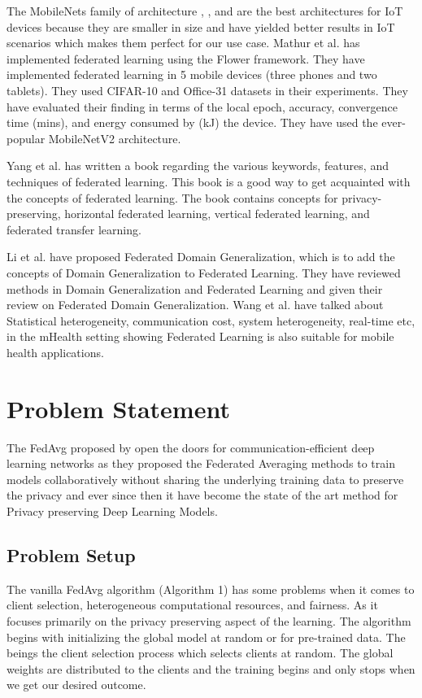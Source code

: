 \documentclass[conference]{IEEEtran}
\begin{document}
The MobileNets family of architecture \cite{howard2017mobilenets}, \cite{sandler2018mobilenetv2}, and \cite{howard2019searching} are the best architectures for IoT devices because they are smaller in size and have yielded better results in IoT scenarios which makes them perfect for our use case. Mathur et al. \cite{mathur2021device} has implemented federated learning using the Flower framework. They have implemented federated learning in 5 mobile devices (three phones and two tablets). They used CIFAR-10 and Office-31 datasets in their experiments. They have evaluated their finding in terms of the local epoch, accuracy, convergence time (mins), and energy consumed by (kJ) the device. They have used the ever-popular MobileNetV2 \cite{sandler2018mobilenetv2} architecture. 
\par Yang et al. \cite{yang2019federated} has written a book regarding the various keywords, features, and techniques of federated learning. This book is a good way to get acquainted with the concepts of federated learning. The book contains concepts for privacy-preserving, horizontal federated learning, vertical federated learning, and federated transfer learning. \par
Li et al. \cite{li2023federated} have proposed Federated Domain Generalization, which is to add the concepts of Domain Generalization to Federated Learning. They have reviewed methods in Domain Generalization and Federated Learning and given their review on Federated Domain Generalization. Wang et al. \cite{wang2023applications} have talked about Statistical heterogeneity, communication cost, system heterogeneity, real-time etc, in the mHealth setting showing Federated Learning is also suitable for mobile health applications.

\section{Problem Statement}
The FedAvg proposed by \cite{mcmahan2017communication} open the doors for communication-efficient deep learning networks as they proposed the Federated Averaging methods to train models collaboratively without sharing the underlying training data to preserve the privacy and ever since then it have become the state of the art method for Privacy preserving Deep Learning Models. 
\subsection{Problem Setup} 
The vanilla FedAvg algorithm (Algorithm 1) has some problems when it comes to client selection, heterogeneous computational resources, and fairness. As it focuses primarily on the privacy preserving aspect of the learning. The algorithm begins with initializing the global model at random or for pre-trained data. The beings the client selection process which selects clients at random. The global weights are distributed to the clients and the training begins and only stops when we get our desired outcome.
\end{document}

